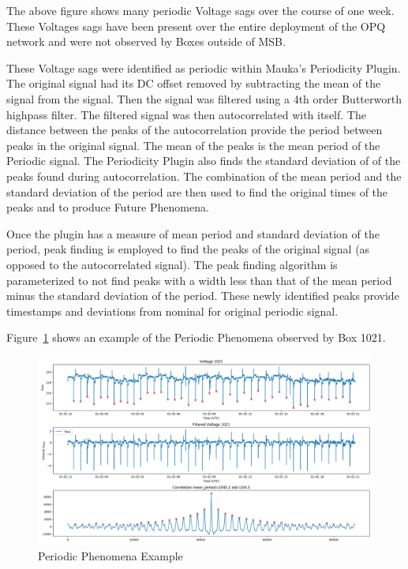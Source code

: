 The above figure shows many periodic Voltage sags over the course of one week. These Voltages sags have been present over the entire deployment of the OPQ network and were not observed by Boxes outside of MSB.

These Voltage sags were identified as periodic within Mauka's Periodicity Plugin. The original signal had its DC offset removed by subtracting the mean of the signal from the signal. Then the signal was filtered using a 4th order Butterworth highpass filter. The filtered signal was then autocorrelated with itself. The distance between the peaks of the autocorrelation provide the period between peaks in the original signal. The mean of the peaks is the mean period of the Periodic signal. The Periodicity Plugin also finds the standard deviation of of the peaks found during autocorrelation. The combination of the mean period and the standard deviation of the period are then used to find the original times of the peaks and to produce Future Phenomena.

Once the plugin has a measure of mean period and standard deviation of the period, peak finding is employed to find the peaks of the original signal (as opposed to the autocorrelated signal). The peak finding algorithm is parameterized to not find peaks with a width less than that of the mean period minus the standard deviation of the period. These newly identified peaks provide timestamps and deviations from nominal for original periodic signal.

Figure~\ref{fig:periodic_example_2} shows an example of the Periodic Phenomena observed by Box 1021.

\begin{figure}[h]
    \centering
    \includegraphics[width=\linewidth]{figures/periodic_example.png}
    \caption{Periodic Phenomena Example}
    \label{fig:periodic_example_2}
\end{figure}

